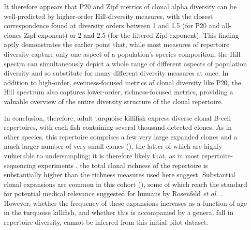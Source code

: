 It therefore appears that P20 and Zipf metrics of clonal alpha diversity can be well-predicted by higher-order Hill-diversity measures, with the closest correspondence found at diversity orders between 1 and 1.5 (for P20 and all-clones Zipf exponent) or 2 and 2.5 (for the filtered Zipf exponent). This finding aptly demonstrates the earlier point that, while most measures of repertoire diversity capture only one aspect of a population's species composition, the Hill spectra can simultaneously depict a whole range of different aspects of population diversity and so substitute for many different diversity measures at once. In addition to high-order, evenness-focused metrics of clonal diversity like P20, the Hill spectrum also captures lower-order, richness-focused metrics, providing a valuable overview of the entire diversity structure of the clonal repertoire.

In conclusion, therefore, adult turquoise killifish express diverse clonal B-cell repertoires, with each fish containing several thousand detected clones. As in other species, this repertoire comprises a few very large expanded clones and a much larger number of very small clones (), the latter of which are highly vulnerable to undersampling; it is therefore likely that, as in most repertoire-sequencing experiments \parencite{mora2016diversity}, the total clonal richness of the repertoire is substantially higher than the richness measures used here suggest. Substantial clonal expansions are common in this cohort (), some of which reach the standard for potential medical relevance suggested for humans by Rosenfeld \textit{et al.} \parencite{rosenfeld2018clonesize}. However, whether the frequency of these expansions increases as a function of age in the turquoise killifish, and whether this is accompanied by a general fall in repertoire diversity, cannot be inferred from this initial pilot dataset.

